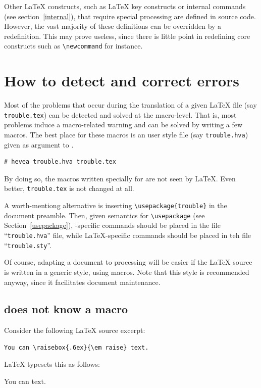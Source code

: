 Other \LaTeX{} constructs, such as
\LaTeX{} key constructs or \hevea{} internal commands (see section~\ref{internal}),
that require special processing are defined
in \hevea{} source code.
However, the vast majority of these definitions can be overridden by a
redefinition.
This may prove useless, since there is little point in
redefining core constructs such as \verb+\newcommand+ for instance.

\section{How to detect and correct errors}\label{trouble}

Most of the problems that occur during the translation of a given
\LaTeX{} file (say \verb+trouble.tex+) can be detected and solved at
the macro-level. That is, most problems induce a macro-related warning
and can be solved by writing a few
macros. The best place for these macros is an user style file (say
\texttt{trouble.hva}) given as
argument to \hevea.
\begin{verbatim}
# hevea trouble.hva trouble.tex
\end{verbatim}
By doing so, the macros written specially for \hevea{} are not
seen by \LaTeX. Even better, \verb+trouble.tex+ is not changed
at all.

A worth-mentiong alternative is inserting \verb+\usepackage{trouble}+
in the document preamble. Then, given \hevea{} semantics for
\verb+\usepackage+ (see Section~\ref{usepackage}),
\hevea{}-specific commands should be placed in
the file ``\texttt{trouble.hva}'' file, while \LaTeX{}-specific commands
should be placed in teh file ``\texttt{trouble.sty}''.

Of course, adapting a document to \hevea{} processing
will be easier if the \LaTeX{} source is written in a
generic style, using macros.
Note that this style is recommended anyway, since it facilitates
document maintenance.

\subsection{\hevea{} does not know a macro}\label{dontknow}
Consider the following \LaTeX{} source excerpt:
\begin{verbatim}
You can \raisebox{.6ex}{\em raise} text.
\end{verbatim}

\LaTeX{} typesets this as follows:
\begin{htmlout}
\begin{showlatex}
You can  text.
\end{showlatex}
\end{htmlout}

